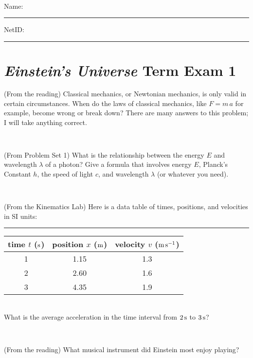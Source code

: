 \documentclass[12pt, letterpaper]{article}
\begin{document}
\vfill ~


\cleardoublepage



\noindent
Name: \rule[-1ex]{0.60\textwidth}{0.1pt}
NetID: \rule[-1ex]{0.20\textwidth}{0.1pt}

\section*{\textsl{Einstein's Universe} Term Exam 1}
\setcounter{problem}{1}


\begin{problem} (From the reading)
Classical mechanics, or Newtonian mechanics, is only valid in certain
circumstances. When do the laws of classical mechanics, like $F =
m\,a$ for example, become wrong or break down? There are many answers
to this problem; I will take anything correct.
\end{problem}


\vfill ~

\begin{problem} (From Problem Set 1)
What is the relationship between the energy $E$ and wavelength
$\lambda$ of a photon? Give a formula that involves energy $E$,
Planck's Constant $h$, the speed of light $c$, and wavelength
$\lambda$ (or whatever you need).
\end{problem}

\vfill ~

\begin{problem} (From the Kinematics Lab)
Here is a data table of times, positions, and velocities in SI units:\\
\rule{1.0in}{0pt}\begin{tabular}{c|c|c}
time $t$ ($\mathrm{s}$) & position $x$ ($\mathrm{m}$) & velocity $v$ ($\mathrm{m}\,\mathrm{s}^{-1}$) \\
\hline
1 & 1.15 & 1.3 \\
2 & 2.60 & 1.6 \\
3 & 4.35 & 1.9 \\
\hline
\end{tabular}\\
What is the average acceleration in the time interval from $2\,\mathrm{s}$ to $3\,\mathrm{s}$?
\end{problem}


\vfill ~

\begin{problem} (From the reading)
What musical instrument did Einstein most enjoy playing?
\end{problem}
\end{document}
